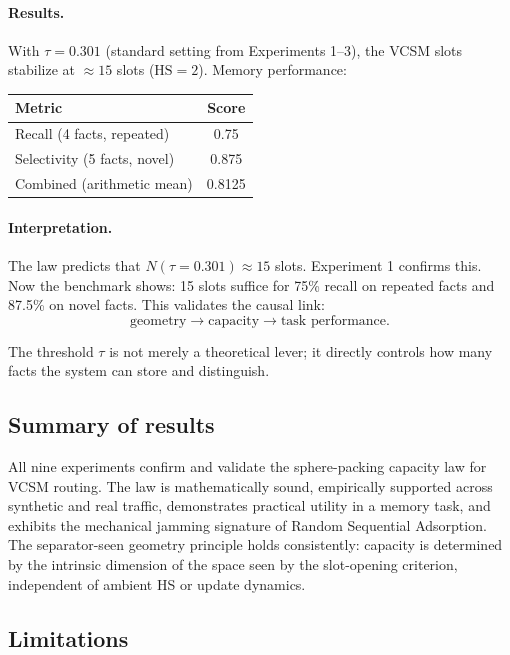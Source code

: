 \documentclass[11pt]{article}
\begin{document}
\paragraph{Results.}
With $\tau=0.301$ (standard setting from Experiments 1--3), the VCSM slots stabilize at
$\approx 15$ slots ($\mathrm{HS}=2$).
Memory performance:
\begin{center}
\begin{tabular}{lc}
\toprule
Metric & Score \\
\midrule
Recall (4 facts, repeated) & 0.75 \\
Selectivity (5 facts, novel) & 0.875 \\
Combined (arithmetic mean) & 0.8125 \\
\bottomrule
\end{tabular}
\end{center}

\paragraph{Interpretation.}
The law predicts that $N(\tau=0.301) \approx 15$ slots.
Experiment 1 confirms this.
Now the benchmark shows:
15 slots suffice for 75\% recall on repeated facts and 87.5\% on novel facts.
This validates the causal link:
\[
  \text{geometry} \to \text{capacity} \to \text{task performance}.
\]

The threshold $\tau$ is not merely a theoretical lever; it directly controls
how many facts the system can store and distinguish.

\subsection{Summary of results}

All nine experiments confirm and validate the sphere-packing capacity law
for VCSM routing.
The law is mathematically sound, empirically supported across synthetic and real traffic,
demonstrates practical utility in a memory task, and exhibits the mechanical jamming
signature of Random Sequential Adsorption.
The separator-seen geometry principle holds consistently:
capacity is determined by the intrinsic dimension of the space seen by the slot-opening
criterion, independent of ambient HS or update dynamics.

\subsection{Limitations}
\end{document}

